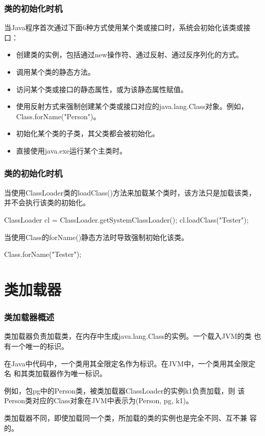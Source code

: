 \begin{frame}[fragile] %
\frametitle{类的初始化时机}

当Java程序首次通过下面6种方式使用某个类或接口时，系统会初始化该类或接口：
\begin{itemize}\kai
\item 创建类的实例，包括通过new操作符、通过反射、通过反序列化的方式。
\item 调用某个类的静态方法。
\item 访问某个类或接口的静态属性，或为该静态属性赋值。
\item 使用反射方式来强制创建某个类或接口对应的java.lang.Class对象。例如，Class.forName("Person")。
\item 初始化某个类的子类，其父类都会被初始化。
\item 直接使用java.exe运行某个主类时。
\end{itemize}


\end{frame}

\begin{frame}[fragile] %
\frametitle{类的初始化时机}

当使用ClassLoader类的loadClass()方法来加载某个类时，该方法只是加载该类，并不会执行该类的初始化。

\begin{javaCode}
ClassLoader cl = ClassLoader.getSystemClassLoader();
cl.loadClass("Tester");  
\end{javaCode}

当使用Class的forName()静态方法时导致强制初始化该类。
\begin{javaCode}
Class.forName("Tester");  
\end{javaCode}
\end{frame}

\section{类加载器}

\begin{frame}[fragile] %
\frametitle{类加载器概述}

类加载器负责加载类，在内存中生成java.lang.Class的实例。一个载入JVM的类
也有一个唯一的标识。


{\kai 在Java中代码中，一个类用其全限定名作为标识。在JVM中，一个类用其全限定名
  和其类加载器作为唯一标识。

  例如，包pg中的Person类，被类加载器ClassLoader的实例k1负责加载，则
  该Person类对应的Class对象在JVM中表示为(Person, pg, k1)。

  类加载器不同，即使加载同一个类，所加载的类的实例也是完全不同、互不兼
  容的。}

\end{frame}

